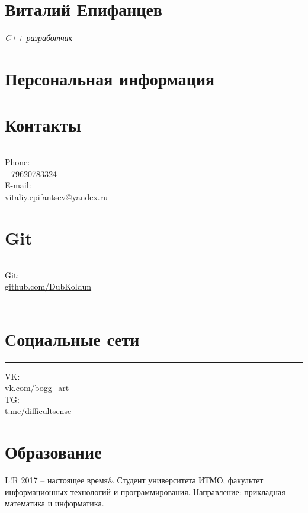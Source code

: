 \documentclass[]{report}
\author{Виталий Епифанцев}
\newcommand\VRule{\color{lightgray}\vrule width 0.5pt}
\begin{document}
\section*{\huge Виталий Епифанцев}
\textit{\large C++ разработчик}


\section*{\Large Персональная информация}

\begin{multicols}{3}

\section*{Контакты}
\hrule\medskip
Phone:\\\smallskip +79620783324\\
E-mail:\\\smallskip vitaliy.epifantsev@yandex.ru

\columnbreak

\section*{Git}
\hrule\medskip
Git:\\\smallskip \href{http://www.github.com/DubKoldun}{github.com/DubKoldun}\\
\\\smallskip 

\columnbreak

\section*{Социальные сети}
\hrule\medskip
VK:\\\smallskip \href{http://www.vk.com/bogg_art}{vk.com/bogg\_art}\\
TG:\\\smallskip \href{http://www.t.me/difficultsense}{t.me/difficultsense}
\columnbreak

\end{multicols}



\section*{\Large Образование}

\begin{tabular}{L!{\VRule}R}
2017 -- настоящее время& Студент университета ИТМО, факультет информационных технологий и программирования. Направление: прикладная математика и информатика.
\end{tabular}
\end{document}
